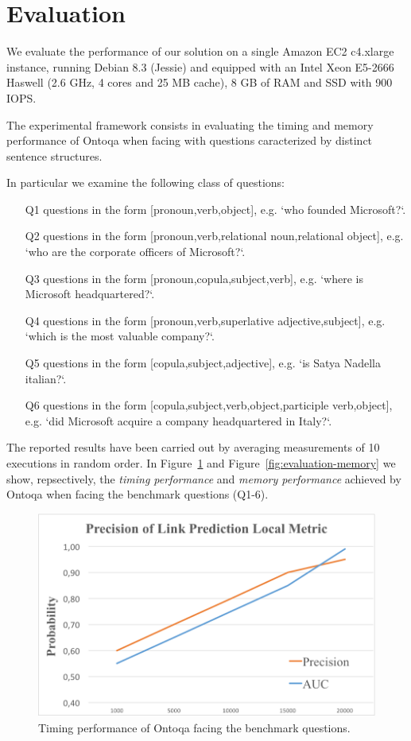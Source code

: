 \section{Evaluation}
\label{sec:evaluation}
We evaluate the performance of our solution on a single
Amazon EC2 c4.xlarge instance, running Debian 8.3 (Jessie)
and equipped with an Intel Xeon E5-2666 Haswell (2.6 GHz,
4 cores and 25 MB cache), 8 GB of RAM and SSD with 900
IOPS.

The experimental framework consists in evaluating the timing and memory performance of Ontoqa when facing with questions caracterized by distinct sentence structures.

In particular we examine the following class of questions:

\begin{itemize}
	\item[Q1] questions in the form [pronoun,verb,object], e.g. `who founded Microsoft?`.
	\item[Q2] questions in the form [pronoun,verb,relational noun,relational object], e.g. `who are the corporate officers of Microsoft?`.
	\item[Q3] questions in the form [pronoun,copula,subject,verb], e.g. `where is Microsoft headquartered?`.
	\item[Q4] questions in the form [pronoun,verb,superlative adjective,subject], e.g. `which is the most valuable company?`.
	\item[Q5] questions in the form [copula,subject,adjective], e.g. `is Satya Nadella italian?`.
	\item[Q6] questions in the form [copula,subject,verb,object,participle verb,object], e.g. `did Microsoft acquire a company headquartered in Italy?`.
\end{itemize}

The reported results have been carried out by averaging measurements of 10 executions in random order.
%
In Figure~\ref{fig:evaluation-time} and Figure~\ref{fig:evaluation-memory} we show, repsectively, the \textit{timing performance} and \textit{memory performance} achieved by Ontoqa when facing the benchmark questions (Q1-6).

\begin{figure}[tp]
	\centering
	\includegraphics{./fig/evaluation-time}
	\caption{Timing performance of Ontoqa facing the benchmark questions.}
	\label{fig:evaluation-time}
\end{figure}

